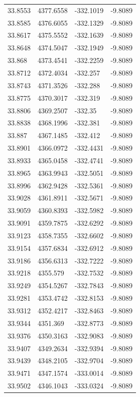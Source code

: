 \begin{table}[H]
\begin{tabular}{llll}
33.8553 & 4377.6558 & -332.1019 & -9.8089 \\
33.8585 & 4376.6055 & -332.1329 & -9.8089 \\
33.8617 & 4375.5552 & -332.1639 & -9.8089 \\
33.8648 & 4374.5047 & -332.1949 & -9.8089 \\
33.868 & 4373.4541 & -332.2259 & -9.8089 \\
33.8712 & 4372.4034 & -332.257 & -9.8089 \\
33.8743 & 4371.3526 & -332.288 & -9.8089 \\
33.8775 & 4370.3017 & -332.319 & -9.8089 \\
33.8806 & 4369.2507 & -332.35 & -9.8089 \\
33.8838 & 4368.1996 & -332.381 & -9.8089 \\
33.887 & 4367.1485 & -332.412 & -9.8089 \\
33.8901 & 4366.0972 & -332.4431 & -9.8089 \\
33.8933 & 4365.0458 & -332.4741 & -9.8089 \\
33.8965 & 4363.9943 & -332.5051 & -9.8089 \\
33.8996 & 4362.9428 & -332.5361 & -9.8089 \\
33.9028 & 4361.8911 & -332.5671 & -9.8089 \\
33.9059 & 4360.8393 & -332.5982 & -9.8089 \\
33.9091 & 4359.7875 & -332.6292 & -9.8089 \\
33.9123 & 4358.7355 & -332.6602 & -9.8089 \\
33.9154 & 4357.6834 & -332.6912 & -9.8089 \\
33.9186 & 4356.6313 & -332.7222 & -9.8089 \\
33.9218 & 4355.579 & -332.7532 & -9.8089 \\
33.9249 & 4354.5267 & -332.7843 & -9.8089 \\
33.9281 & 4353.4742 & -332.8153 & -9.8089 \\
33.9312 & 4352.4217 & -332.8463 & -9.8089 \\
33.9344 & 4351.369 & -332.8773 & -9.8089 \\
33.9376 & 4350.3163 & -332.9083 & -9.8089 \\
33.9407 & 4349.2634 & -332.9394 & -9.8089 \\
33.9439 & 4348.2105 & -332.9704 & -9.8089 \\
33.9471 & 4347.1574 & -333.0014 & -9.8089 \\
33.9502 & 4346.1043 & -333.0324 & -9.8089 \\

\end{tabular}
\end{table}
